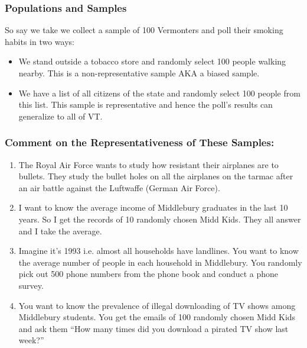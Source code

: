 \documentclass[handout]{beamer}
\newcommand{\blue}[1]{\textcolor{blue2}{#1}}
\begin{document}
\begin{frame}
\frametitle{Populations and Samples}
So say we take we collect a sample of 100 Vermonters and poll their smoking habits in two ways:

\begin{itemize}
\pause\item We stand outside a tobacco store and randomly select 100 people walking nearby.  This is a non-representative sample AKA a \blue{biased sample}.
\pause\item We have a list of all citizens of the state and randomly select 100 people from this list.  This sample is representative and hence the poll's results can generalize to all of VT.
\end{itemize}

\end{frame}


\begin{frame}
\frametitle{Comment on the Representativeness of These Samples:}

\begin{small}
\begin{enumerate}
\item The Royal Air Force wants to study how resistant their airplanes are to bullets. They study the bullet holes on all the airplanes on the tarmac after an air battle against the Luftwaffe (German Air Force).
\item I want to know the average income of Middlebury graduates in the last 10 years.  So I get the records of 10 randomly chosen Midd Kids.  They all answer and I take the average.
\item Imagine it's 1993 i.e. almost all households have landlines.  You want to know the average number of people in each household in Middlebury.  You randomly pick out 500 phone numbers from the phone book and conduct a phone survey.
\item You want to know the prevalence of illegal downloading of TV shows among Middlebury students.  You get the emails of 100 randomly chosen Midd Kids and ask them ``How many times did you download a pirated TV show last week?''
\end{enumerate}
\end{small}

\end{frame}
\end{document}
